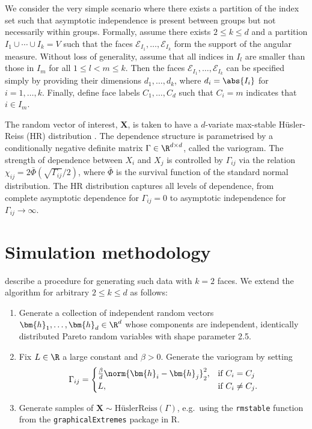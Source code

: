 \documentclass[en-GB, a4paper, nobind]{templates/bathreport}
\begin{document}
We consider the very simple scenario where there exists a partition of the index set such that asymptotic independence is present between groups but not necessarily within groups. Formally, assume there exists \(2\leq k\leq d\) and a partition \(I_1\cup\cdots\cup I_k = V\) such that the faces \(\mathcal{E}_{I_1},\ldots,\mathcal{E}_{I_k}\) form the support of the angular measure. Without loss of generality, assume that all indices in \(I_l\) are smaller than those in \(I_m\) for all \(1\leq l<m\leq k\). Then the faces \(\mathcal{E}_{I_1},\ldots,\mathcal{E}_{I_k}\) can be specified simply by providing their dimensions \(d_1,\ldots,d_k\), where \(d_i=\abs{I_i}\) for \(i=1,\ldots,k\). Finally, define face labels \(C_1,\ldots,C_d\) such that \(C_i=m\) indicates that \(i\in I_m\).

The random vector of interest, \(\bm{X}\), is taken to have a \(d\)-variate max-stable Hüsler-Reiss (HR) distribution \autocite{engelkeEstimationHuslerReissDistributions2015}. The dependence structure is parametrised by a conditionally negative definite matrix \(\Gamma\in\R^{d\times d}\), called the variogram. The strength of dependence between \(X_i\) and \(X_j\) is controlled by \(\Gamma_{ij}\) via the relation \(\chi_{ij}=2\bar{\Phi}(\sqrt{\Gamma_{ij}}/2)\), where \(\bar{\Phi}\) is the survival function of the standard normal distribution. The HR distribution captures all levels of dependence, from complete asymptotic dependence for \(\Gamma_{ij}=0\) to asymptotic independence for \(\Gamma_{ij}\to\infty\).

\hypertarget{simulation-methodology}{%
\section{Simulation methodology}\label{simulation-methodology}}

\textcite{fomichovDetectionGroupsConcomitant2020} describe a procedure for generating such data with \(k=2\) faces. We extend the algorithm for arbitrary \(2\leq k\leq d\) as follows:

\begin{enumerate}
\item Generate a collection of independent random vectors $\bm{h}_1,\ldots,\bm{h}_d\in\R^d$ whose components are independent, identically distributed Pareto random variables with shape parameter 2.5.
\item Fix $L\in\R$ a large constant and $\beta>0$. Generate the variogram by setting
\begin{equation*}
\Gamma_{ij} = \begin{cases}
\frac{\beta}{d}\norm{\bm{h}_i - \bm{h}_j}_2^2, & \text{if $C_i=C_j$} \\
L, & \text{if $C_i\neq C_j$}.
\end{cases}
\end{equation*}
\item Generate samples of $\bm{X}\sim\mathrm{HüslerReiss}(\Gamma)$, e.g.\ using the \texttt{rmstable} function from the \texttt{graphicalExtremes} package in \textsf{R}.
\end{enumerate}
\end{document}
